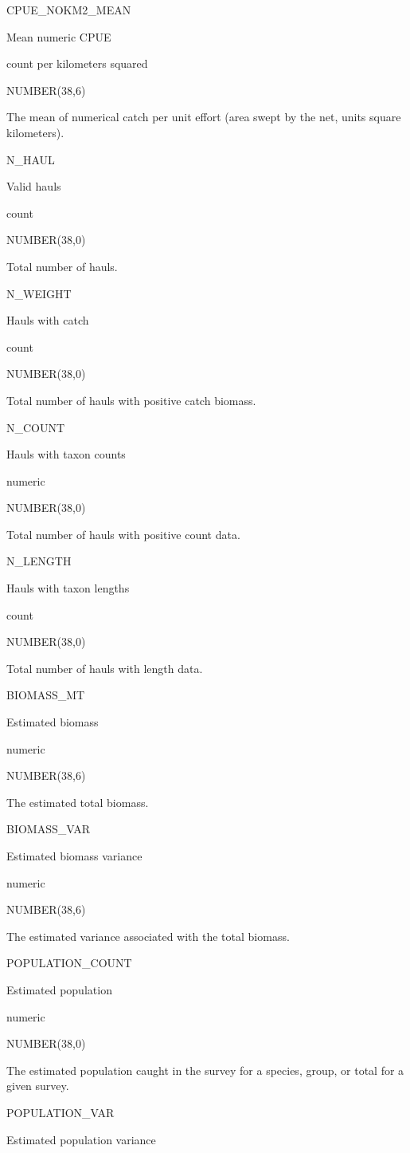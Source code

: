 \documentclass[
  letterpaper,
  oneside,
  open=any]{scrbook}
\begin{document}
CPUE\_NOKM2\_MEAN

Mean numeric CPUE

count per kilometers squared

NUMBER(38,6)

The mean of numerical catch per unit effort (area swept by the net,
units square kilometers).

N\_HAUL

Valid hauls

count

NUMBER(38,0)

Total number of hauls.

N\_WEIGHT

Hauls with catch

count

NUMBER(38,0)

Total number of hauls with positive catch biomass.

N\_COUNT

Hauls with taxon counts

numeric

NUMBER(38,0)

Total number of hauls with positive count data.

N\_LENGTH

Hauls with taxon lengths

count

NUMBER(38,0)

Total number of hauls with length data.

BIOMASS\_MT

Estimated biomass

numeric

NUMBER(38,6)

The estimated total biomass.

BIOMASS\_VAR

Estimated biomass variance

numeric

NUMBER(38,6)

The estimated variance associated with the total biomass.

POPULATION\_COUNT

Estimated population

numeric

NUMBER(38,0)

The estimated population caught in the survey for a species, group, or
total for a given survey.

POPULATION\_VAR

Estimated population variance
\end{document}
